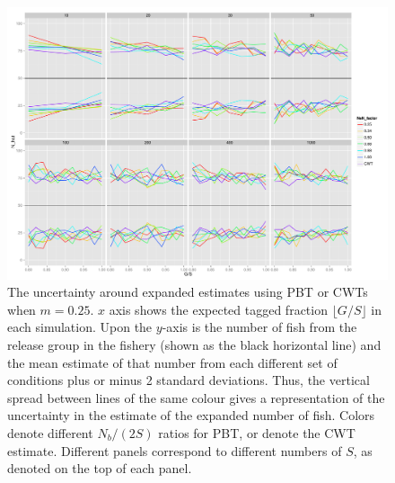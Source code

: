 \documentclass[11pt]{article}
\begin{document}
\begin{figure}
\includegraphics[width = .93\textwidth]{./images/sd_line_horns_m_0_25.pdf}
\caption{The uncertainty around expanded estimates using PBT or CWTs when $m = 0.25$.  $x$ axis shows the
expected tagged fraction $\lfloor G/S \rfloor$ in each simulation. Upon the $y$-axis is the number of fish from the
release group in the fishery (shown as the black horizontal line) and the mean estimate of that number from each different set of 
conditions plus or minus 2 standard deviations.  Thus, the vertical spread between lines of the same colour gives a representation
of the uncertainty in the estimate of the expanded number of fish. Colors denote different $N_b/(2S)$ ratios for PBT, or denote
the CWT estimate.  Different
panels correspond to different numbers of $S$, as denoted on the top of each panel.
\label{fig:horn0.25}}
\end{figure}
\end{document}
